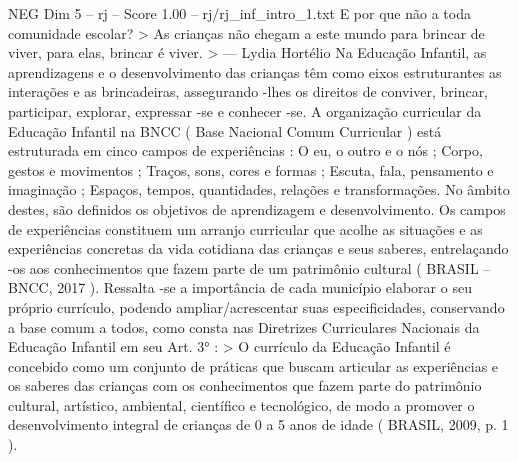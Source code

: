 \begin{textsample}{NEG Dim 5 – rj – Score 1.00 – rj/rj\_inf\_intro\_1.txt}
E por que não a toda comunidade escolar? > As crianças não chegam a este mundo para brincar de viver, para elas, brincar é viver. > — Lydia Hortélio Na Educação Infantil, as aprendizagens e o desenvolvimento das crianças têm como eixos estruturantes as interações e as brincadeiras, assegurando -lhes os direitos de conviver, brincar, participar, explorar, expressar -se e conhecer -se.
A organização curricular da Educação Infantil na BNCC ( Base Nacional Comum Curricular ) está estruturada em cinco campos de experiências : O eu, o outro e o nós ; Corpo, gestos e movimentos ; Traços, sons, cores e formas ; Escuta, fala, pensamento e imaginação ; Espaços, tempos, quantidades, relações e transformações.
No âmbito destes, são definidos os objetivos de aprendizagem e desenvolvimento.
Os campos de experiências constituem um arranjo curricular que acolhe as situações e as experiências concretas da vida cotidiana das crianças e seus saberes, entrelaçando -os aos conhecimentos que fazem parte de um patrimônio cultural ( BRASIL – BNCC, 2017 ).
Ressalta -se a importância de cada município elaborar o seu próprio currículo, podendo ampliar/acrescentar suas especificidades, conservando a base comum a todos, como consta nas Diretrizes Curriculares Nacionais da Educação Infantil em seu Art. 3{\EmojiFont °} : > O currículo da Educação Infantil é concebido como um conjunto de práticas que buscam articular as experiências e os saberes das crianças com os conhecimentos que fazem parte do patrimônio cultural, artístico, ambiental, científico e tecnológico, de modo a promover o desenvolvimento integral de crianças de 0 a 5 anos de idade ( BRASIL, 2009, p. 1 ).

\end{textsample}
